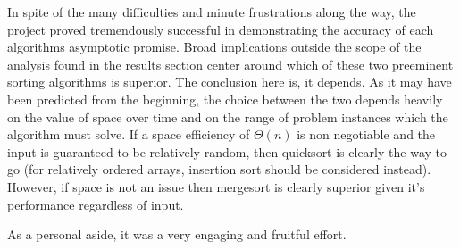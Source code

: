 \documentclass[11pt,letterpaper]{report}
\begin{document}
In spite of the many difficulties and minute frustrations along the way, the project proved tremendously successful in demonstrating the accuracy of each algorithms asymptotic promise. Broad implications outside the scope of the analysis found in the results section center around which of these two preeminent sorting algorithms is superior. The conclusion here is, it depends. As it may have been predicted from the beginning, the choice between the two depends heavily on the value of space over time and on the range of problem instances which the algorithm must solve. If a space efficiency of $\Theta(n)$ is non negotiable and the input is guaranteed to be relatively random, then quicksort is clearly the way to go (for relatively ordered arrays, insertion sort should be considered instead). However, if space is not an issue then mergesort is clearly superior given it's performance regardless of input. 

As a personal aside, it was a very engaging and fruitful effort. 
\end{document}
